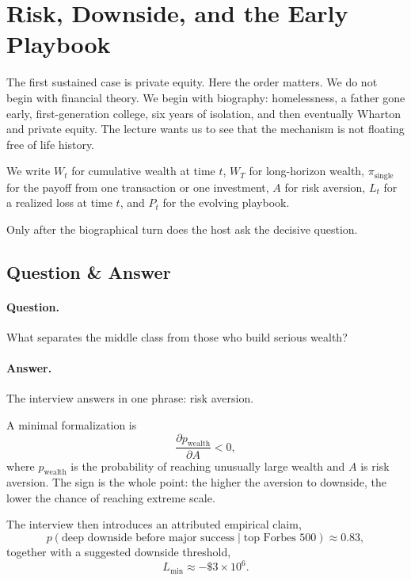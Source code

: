 \section{Risk, Downside, and the Early Playbook}

The first sustained case is private equity. Here the order matters. We do not begin with financial theory. We begin with biography: homelessness, a father gone early, first-generation college, six years of isolation, and then eventually Wharton and private equity. The lecture wants us to see that the mechanism is not floating free of life history.

\begin{definition}
We write \(W_t\) for cumulative wealth at time \(t\), \(W_T\) for long-horizon wealth, \(\pi_{\mathrm{single}}\) for the payoff from one transaction or one investment, \(A\) for risk aversion, \(L_t\) for a realized loss at time \(t\), and \(P_t\) for the evolving playbook.
\end{definition}

Only after the biographical turn does the host ask the decisive question.

\subsection{Question \& Answer}

\paragraph{Question.} What separates the middle class from those who build serious wealth?

\paragraph{Answer.} The interview answers in one phrase: risk aversion.

A minimal formalization is
\begin{equation}
\frac{\partial p_{\mathrm{wealth}}}{\partial A} < 0,
\end{equation}
where \(p_{\mathrm{wealth}}\) is the probability of reaching unusually large wealth and \(A\) is risk aversion. The sign is the whole point: the higher the aversion to downside, the lower the chance of reaching extreme scale.

The interview then introduces an attributed empirical claim,
\begin{equation}
p(\mbox{deep downside before major success}\mid \mbox{top Forbes 500}) \approx 0.83,
\end{equation}
together with a suggested downside threshold,
\begin{equation}
L_{\min} \approx -\$3\times 10^6.
\end{equation}

